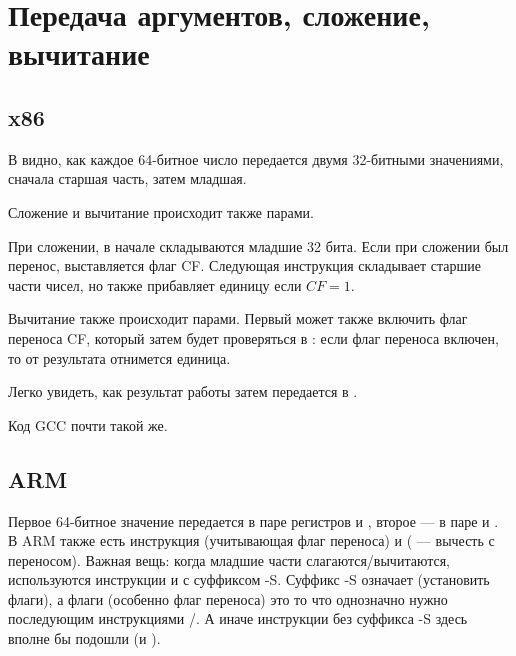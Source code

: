 ﻿\section{Передача аргументов, сложение, вычитание}



\subsection{x86}



В  видно, как каждое 64-битное число передается двумя 32-битными значениями,
сначала старшая часть, затем младшая.

Сложение и вычитание происходит также парами. 

При сложении, в начале складываются младшие 32 бита.
Если при сложении был перенос, выставляется флаг CF.
Следующая инструкция  складывает старшие части чисел, но также прибавляет единицу если $CF=1$.

Вычитание также происходит парами.
Первый \SUB может также включить флаг переноса CF, который затем будет проверяться в :
если флаг переноса включен, то от результата отнимется единица.

Легко увидеть, как результат работы  затем передается в \printf{}.



Код GCC почти такой же.

\subsection{ARM}



Первое 64-битное значение передается в паре регистров  и , второе --- в паре  и .
В ARM также есть инструкция  (учитывающая флаг переноса) и  ( --- вычесть с переносом).
Важная вещь: когда младшие части слагаются/вычитаются, используются инструкции  и  с суффиксом -S.
Суффикс -S означает  (установить флаги), а флаги (особенно флаг переноса) это то что однозначно нужно последующим инструкциями /.
А иначе инструкции без суффикса -S здесь вполне бы подошли (\ADD и \SUB).

